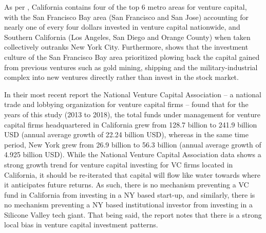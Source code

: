 
As per \cite{florida2016rise}, California contains four of the top 6 metro areas for venture capital, with the San Francisco Bay area (San Francisco and San Jose) accounting for nearly one of every four dollars invested in venture capital nationwide, and Southern California (Los Angeles, San Diego and Orange County) when taken collectively outranks New York City. Furthermore, \cite{adams2018diversified} shows that the investment culture of the San Francisco Bay area prioritized plowing back the capital gained from previous ventures such as gold mining, shipping and the military-industrial complex into new ventures directly rather than invest in the stock market. 

In their most recent report  the National Venture Capital Association\citeyearpar{NVCA2020} -- a national trade and lobbying organization for venture capital firms -- found that for the  years of this study (2013 to 2018), the total funds under management for venture capital firms headquartered in California grew from 128.7 billion to 241.9 billion USD (annual average growth of 22.24 billion USD), whereas in the same time period, New York grew from 26.9 billion to 56.3 billion (annual average growth of 4.925 billion USD). While the  National Venture Capital Association data shows a strong growth trend for venture capital investing for VC firms located in California, it should be re-iterated that capital will flow like water towards where it anticipates future returns.  As such, there is no mechanism preventing a VC fund in California from investing in a NY based start-up, and similarly, there is no mechanism preventing a NY based institutional investor from investing in a Silicone Valley tech giant. That being said, the report notes that there is a strong local bias in venture capital investment patterns. 


\nocite{NVCA2020data}



